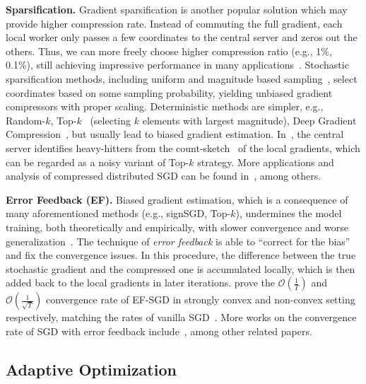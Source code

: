 \documentclass[11pt]{article}
\begin{document}
\textbf{Sparsification.}\hspace{0.1in} Gradient sparsification is another popular solution which may provide higher compression rate. Instead of commuting the full gradient, each local worker only passes a few coordinates to the central server and zeros out the others. Thus, we can more freely choose higher compression ratio (e.g., 1\%, 0.1\%), still achieving impressive performance in many applications~\cite{Proc:Lin_ICLR18}. Stochastic sparsification methods, including uniform and magnitude based sampling~\cite{wangni2018gradient}, select coordinates based on some sampling probability, yielding unbiased gradient compressors with proper scaling. Deterministic methods are simpler, e.g., Random-$k$, Top-$k$~\cite{stich2018sparsified,shi2019convergence} (selecting $k$ elements with largest magnitude), Deep Gradient Compression~\cite{Proc:Lin_ICLR18}, but usually lead to biased gradient estimation. In~\cite{Proc:Ivkin_NIPS19}, the central server identifies heavy-hitters from the count-sketch~\cite{Proc:Charikar_ICALP02} of the local gradients, which can be regarded as a noisy variant of Top-$k$ strategy. More applications and analysis of compressed distributed SGD can be found in~\cite{jiang2018linear,Proc:Shen_ICML18,alistarh2018convergence,Proc:Basu_NIPS19,Proc:Jiang_SIGMOD18}, among others.

\textbf{Error Feedback (EF).}\hspace{0.1in} Biased gradient estimation, which is a consequence of many aforementioned methods (e.g., signSGD, Top-$k$), undermines the model training, both theoretically and empirically, with slower convergence and worse generalization~\cite{ajalloeian2020analysis,Arxiv:Beznosikov20}. The technique of \textit{error feedback} is able to ``correct for the bias'' and fix the convergence issues. 
In this procedure, the difference between the true stochastic gradient and the compressed one is accumulated locally, which is then added back to the local gradients in later iterations. \cite{stich2018sparsified,karimireddy2019error} prove the $\mathcal O(\frac{1}{T})$ and $\mathcal O(\frac{1}{\sqrt T})$ convergence rate of EF-SGD in strongly convex and non-convex setting respectively, matching the rates of vanilla SGD~\cite{nemirovski2009robust,ghadimi2013stochastic}. More works on the convergence rate of SGD with error feedback include~\cite{Proc:Zheng_NIPS19,Article:Stich_arxiv19}, among other related papers.

\vspace{-0.05in}
\subsection{Adaptive Optimization}
\vspace{-0.05in}
\end{document}
